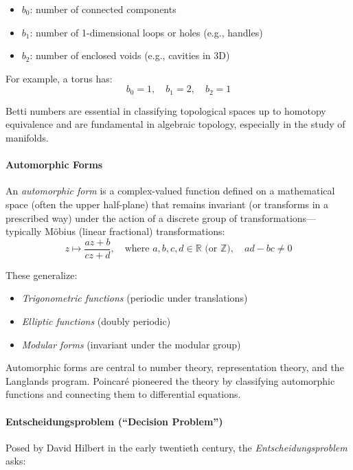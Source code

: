 \documentclass[9pt]{article}
\begin{document}
\begin{itemize}
  \item $b_0$: number of connected components
  \item $b_1$: number of 1-dimensional loops or holes (e.g., handles)
  \item $b_2$: number of enclosed voids (e.g., cavities in 3D)
\end{itemize}

\noindent For example, a torus has:
\[
b_0 = 1, \quad b_1 = 2, \quad b_2 = 1
\]

\noindent Betti numbers are essential in classifying topological spaces up to homotopy equivalence and are fundamental in algebraic topology, especially in the study of manifolds.

\bigskip

\paragraph{Automorphic Forms}
An \textit{automorphic form} is a complex-valued function defined on a mathematical space (often the upper half-plane) that remains invariant (or transforms in a prescribed way) under the action of a discrete group of transformations—typically Möbius (linear fractional) transformations:
\[
z \mapsto \frac{az + b}{cz + d}, \quad \text{where } a,b,c,d \in \mathbb{R} \text{ (or }\mathbb{Z}\text{)},\quad ad - bc \neq 0
\]

These generalize:
\begin{itemize}
  \item \textit{Trigonometric functions} (periodic under translations)
  \item \textit{Elliptic functions} (doubly periodic)
  \item \textit{Modular forms} (invariant under the modular group)
\end{itemize}

Automorphic forms are central to number theory, representation theory, and the Langlands program. Poincaré pioneered the theory by classifying automorphic functions and connecting them to differential equations.

\bigskip

\paragraph{Entscheidungsproblem (``Decision Problem'')}
Posed by David Hilbert in the early twentieth century, the \textit{Entscheidungsproblem} asks:
\end{document}
